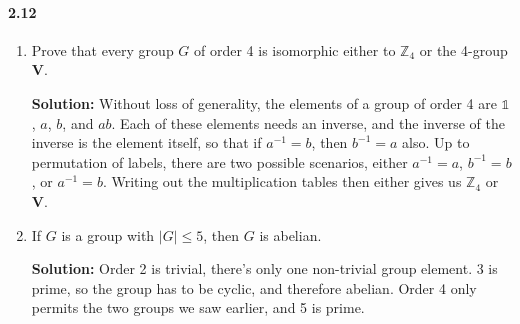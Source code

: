 \documentclass[12pt,a4paper]{article}
\providecommand{\id}{\mathbb{1}}
\providecommand{\abs}[1]{\left \vert #1 \right \vert}
\providecommand{\soln}{\textbf{Solution: }}
\providecommand{\inv}{^{-1}}
\begin{document}
\paragraph*{2.12}
\begin{enumerate}[label=(\roman*)]
\item Prove that every group $G$ of order 4 is isomorphic either to $\mathbb{Z}_4$ or the 4-group $\mathbf{V}$.

\soln Without loss of generality, the elements of a group of order 4 are $\id$, $a$, $b$, and $ab$. 
Each of these elements needs an inverse, and the inverse of the inverse is the element itself, so that if $a\inv = b$, then $b\inv = a$ also. 
Up to permutation of labels, there are two possible scenarios, either $a\inv = a$, $b\inv = b$, or $a\inv = b$. Writing out the multiplication tables then either gives us $\mathbb{Z}_4$ or $\mathbf{V}$.


\item If $G$ is a group with $\abs{G} \leq 5$, then $G$ is abelian.

\soln Order 2 is trivial, there's only one non-trivial group element.
3 is prime, so the group has to be cyclic, and therefore abelian.
Order 4 only permits the two groups we saw earlier, and 5 is prime.
\end{enumerate}
\end{document}
